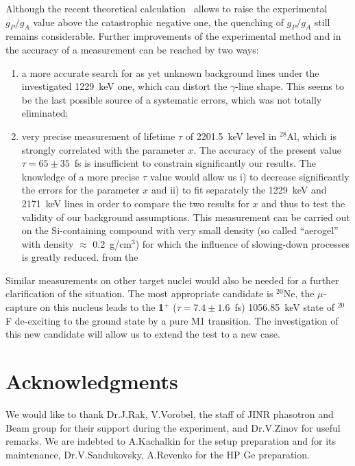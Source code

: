 Although the recent theoretical calculation~\cite{Siiskonen98} allows
to raise the experimental $g_P/g_A$ value above the catastrophic
negative
one, the quenching
of $g_P/g_A$ still remains considerable. Further improvements of
the experimental method and in the accuracy of a measurement can be
reached by two ways:
\begin{enumerate}
\item a more accurate search for as yet unknown background lines
under the investigated 1229~keV one, which can 
distort the $\gamma$-line shape.
This seems to be the last possible source of a
systematic errors, which was not totally eliminated;
\item very precise measurement of lifetime $\tau$ of 2201.5~keV level in
$^{28}$Al,
which is strongly correlated with the parameter $x$. The accuracy of the
present value $\tau = 65 \pm 35$~fs is insufficient 
to constrain significantly our results.
The knowledge of a more precise $\tau$ value would allow us i) to
decrease
significantly the errors for the parameter $x$ and 
ii) to fit separately the 1229~keV and 2171~keV lines in order to
compare the two
results for $x$ and thus to test the validity of our background
assumptions.
This measurement can be carried
out on the Si-containing compound with very small density (so called
``aerogel'' 
with density $\approx$ 0.2~g/cm$^3$)
for which the influence of slowing-down processes
is greatly reduced.
from the 
\end{enumerate}

Similar measurements on other target nuclei would also be needed
for a further clarification of the situation. The most appropriate
candidate is  $^{20}$Ne, the $\mu$-capture on this nucleus
leads to the {\bf 1$^+$} ($\tau = 7.4 \pm 1.6$~fs) 1056.85~keV state of 
$^{20}$F de-exciting to the ground state by a pure M1 transition. 
The investigation of this new candidate  will allow us to extend the 
test to a new case.

\section{Acknowledgments}
We would like to thank Dr.J.Rak, V.Vorobel, the staff of  JINR phasotron
and
Beam group for their support during the experiment, and Dr.V.Zinov for
useful remarks.
We are indebted to A.Kachalkin for the setup preparation and for its
 maintenance, 
Dr.V.Sandukovsky, A.Revenko for the HP Ge preparation.

